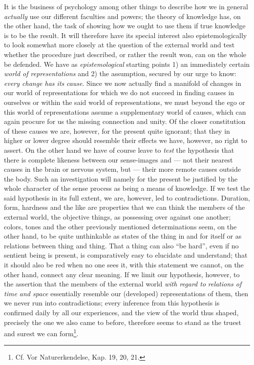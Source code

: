 \documentclass[12pt,a4paper,openany]{book}
\newcommand{\opage}[1]{\marginnote{\footnotesize\textit{[#1]}}}
\begin{document}
It is the business of psychology among other things to describe how we in general
\emph{actually} use our different faculties and powers; the theory of knowledge has, on
the other hand, the task of showing how we ought to use them if true knowledge is to be
the result. It will therefore have its special
\setcounter{footnote}{0}%
\opage{252}interest also epistemologically to look somewhat more closely at the question of the
external world and test whether the procedure just described, or rather the result won,
can on the whole be defended. We have as \emph{epistemological} starting points 1) an
immediately certain \emph{world of representations} and 2) the assumption, secured by our
urge to know: \emph{every change has its}
\emph{cause}. Since we now actually find a manifold of changes in our world of
representations for which we do not succeed in finding causes in ourselves or within the
said world of representations, we must beyond the ego or this world of representations
assume a supplementary world of causes, which can again procure for us the missing
connection and unity. Of the closer constitution of these causes we are, however, for the
present quite ignorant; that they in higher or lower degree should resemble their effects
we have, however, no right to assert. On the other hand we have of course leave to
\emph{test} the hypothesis that there is complete likeness between our sense-images and
--- not their nearest causes in the brain or nervous system, but --- their more remote
causes outside the body. Such an investigation will namely for the present be justified
by the whole character of the sense process as being a means of knowledge. If we test the
said hypothesis in its full extent, we are, however, led to contradictions. Duration,
form, hardness and the like are properties that we can think the members of the external
world, the objective things, as possessing over against one another; colors, tones and
the other previously mentioned determinations seem, on the other hand, to be quite
unthinkable as states of the thing in and for itself or as relations between thing and
thing. That a thing can also ``be hard'', even if no sentient being is present, is
comparatively easy to elucidate and understand; that it should also be red when no one
sees it, with this statement we cannot, on the other hand, connect any clear meaning. If
we limit our hypothesis, however, to the assertion that the members of the external world
\emph{with regard to}
\setcounter{footnote}{0}%
\opage{253}\emph{relations of time and space} essentially resemble our (developed)
representations of them, then we never run into contradictions; every inference from this
hypothesis is confirmed daily by all our experiences, and the view of the world thus
shaped, precisely the one we also came to before, therefore seems to stand as the truest
and surest we can form\footnote[1]{Cf. Vor Naturerkendelse, Kap. 19, 20, 21.}.
\end{document}

